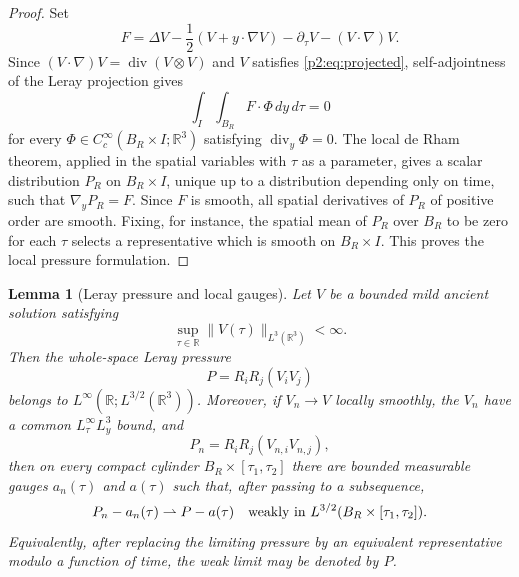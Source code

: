 \documentclass[11pt]{amsart}
\theoremstyle{plain}
\newtheorem{lemma}[lemma]{Lemma}
\theoremstyle{definition}
\theoremstyle{remark}
\numberwithin{equation}{section}
\newcommand{\R}{\mathbb R}
\newcommand{\divergence}{\operatorname{div}}
\begin{document}
\begin{proof}
Set
\[
   F=
   \Delta V-\frac12(V+y\cdot\nabla V)
   -\partial_\tau V-(V\cdot\nabla)V .
\]
Since \((V\cdot\nabla)V=\divergence(V\otimes V)\) and \(V\) satisfies
\eqref{p2:eq:projected}, self-adjointness of the Leray projection gives
\[
   \int_I\int_{B_R}F\cdot\Phi\,dy\,d\tau=0
\]
for every \(\Phi\in C_c^\infty(B_R\times I;\R^3)\) satisfying
\(\divergence_y\Phi=0\).  The local de Rham theorem, applied in the spatial
variables with \(\tau\) as a parameter, gives a scalar distribution \(P_R\) on
\(B_R\times I\), unique up to a distribution depending only on time, such that
\(\nabla_yP_R=F\).  Since \(F\) is smooth, all spatial derivatives of \(P_R\)
of positive order are smooth.  Fixing, for instance, the spatial mean of
\(P_R\) over \(B_R\) to be zero for each \(\tau\) selects a representative
which is smooth on \(B_R\times I\).  This proves the local pressure
formulation.
\end{proof}

\begin{lemma}[Leray pressure and local gauges]\label{p2:lem:pressure-reconstruction}
Let \(V\) be a bounded mild ancient solution satisfying
\[
   \sup_{\tau\in\R}\|V(\tau)\|_{L^3(\R^3)}<\infty .
\]
Then the whole-space Leray pressure
\[
   P=R_iR_j(V_iV_j)
\]
belongs to \(L^\infty(\R;L^{3/2}(\R^3))\).  Moreover, if \(V_n\to V\) locally
smoothly, the \(V_n\) have a common \(L^\infty_\tau L^3_y\) bound, and
\[
   P_n=R_iR_j(V_{n,i}V_{n,j}),
\]
then on every compact cylinder \(B_R\times[\tau_1,\tau_2]\) there are bounded
measurable gauges \(a_n(\tau)\) and \(a(\tau)\) such that, after passing to a
subsequence,
\[
   P_n-a_n(\tau)
   \rightharpoonup P-a(\tau)
   \quad\hbox{weakly in }L^{3/2}(B_R\times[\tau_1,\tau_2]).
\]
Equivalently, after replacing the limiting pressure by an equivalent
representative modulo a function of time, the weak limit may be denoted by
\(P\).
\end{lemma}
\end{document}
